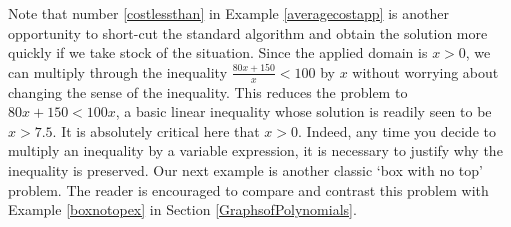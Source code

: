 Note that number \ref{costlessthan} in Example \ref{averagecostapp} is another opportunity to short-cut the standard algorithm and obtain the solution more quickly if we take stock of the situation.  Since the applied domain is $x>0$, we can multiply through the inequality $\frac{80x+150}{x}  <  100$ by $x$ without worrying about changing the sense of the inequality.  This reduces the problem to  $80x+150 < 100x$, a basic linear inequality whose solution is readily seen to be $x > 7.5$.   It is absolutely critical here that $x>0$. Indeed, any time you decide to multiply an inequality by a variable expression, it is necessary to justify why the inequality is preserved.  Our next example is another classic `box with no top' problem.  The reader is encouraged to compare and contrast this problem with  Example \ref{boxnotopex} in Section \ref{GraphsofPolynomials}.

